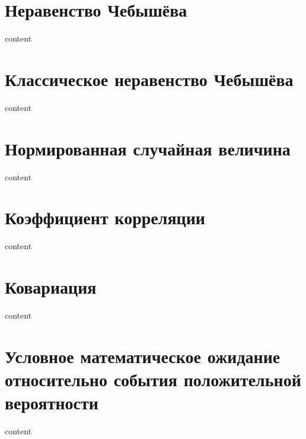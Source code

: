 \section{Неравенство Чебышёва}

content

\section{Классическое неравенство Чебышёва}

content

\section{Нормированная случайная величина}

content

\section{Коэффициент корреляции}

content

\section{Ковариация}

content

\section{Условное математическое ожидание относительно события положительной вероятности}

content
